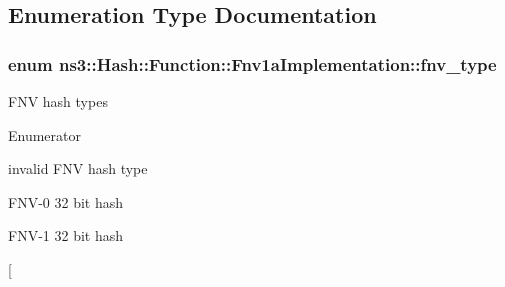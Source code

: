 \subsection{Enumeration Type Documentation}
\subsubsection[{\texorpdfstring{fnv\+\_\+type}{fnv_type}}]{\setlength{\rightskip}{0pt plus 5cm}enum {\bf ns3\+::\+Hash\+::\+Function\+::\+Fnv1a\+Implementation\+::fnv\+\_\+type}}\hypertarget{group__hash__fnv_gade4dc6882f24a5ecd6b9d41e6698b275}{}\label{group__hash__fnv_gade4dc6882f24a5ecd6b9d41e6698b275}
F\+NV hash types \begin{Desc}
\item[Enumerator]\par
\begin{description}
\item[{\em 
F\+N\+V\+\_\+\+N\+O\+NE\hypertarget{group__hash__fnv_ggade4dc6882f24a5ecd6b9d41e6698b275a9ddf1e553238aab7e8c19411f88be262}{}\label{group__hash__fnv_ggade4dc6882f24a5ecd6b9d41e6698b275a9ddf1e553238aab7e8c19411f88be262}
}]invalid F\+NV hash type \item[{\em 
F\+N\+V0\+\_\+32\hypertarget{group__hash__fnv_ggade4dc6882f24a5ecd6b9d41e6698b275ae43fe5fd2bea5e0a1a4f34144f7acb84}{}\label{group__hash__fnv_ggade4dc6882f24a5ecd6b9d41e6698b275ae43fe5fd2bea5e0a1a4f34144f7acb84}
}]F\+N\+V-\/0 32 bit hash \item[{\em 
F\+N\+V1\+\_\+32\hypertarget{group__hash__fnv_ggade4dc6882f24a5ecd6b9d41e6698b275af56bb58f654f4ad17f9e84e7118021a9}{}\label{group__hash__fnv_ggade4dc6882f24a5ecd6b9d41e6698b275af56bb58f654f4ad17f9e84e7118021a9}
}]F\+N\+V-\/1 32 bit hash \item[{\em 
}
\end{description}
\end{Desc}
